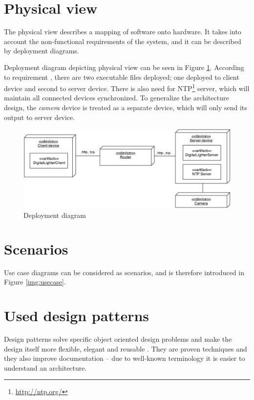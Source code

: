\section{Physical view}
The physical view \cite{Kruchten:1995:VMA:624610.625529} describes a mapping of software onto hardware. 
It takes into account the non-functional requirements of the system, and it can be described by deployment diagrams.

Deployment diagram depicting physical view can be seen in Figure \ref{fig:architecture_deployment_diagram}.
According to requirement , there are two executable files deployed; one deployed to client device and second to server device.
There is also need for NTP\footnote{\url{http://ntp.org/}} server, which will maintain all connected devices synchronized.
To generalize the architecture design, the \emph{camera} device is treated as a separate device, which will only send its output to server device.

\begin{figure}[h]
	\centering
		\includegraphics[width=15cm]{softwareArchitecture/deployment-diagram.pdf}
	\caption{Deployment diagram}
	\label{fig:architecture_deployment_diagram}
\end{figure}

\section{Scenarios}
Use case diagrams can be considered as scenarios, and is therefore introduced in Figure \ref{img:usecase}.

\section{Used design patterns}
Design patterns solve specific object oriented design problems and make the design itself more flexible, elegant and reusable \cite[p.~11]{Gamma:1995:DPE:186897}.
They are proven techniques and they also improve documentation -- due to well-known terminology it is easier to understand an architecture.


